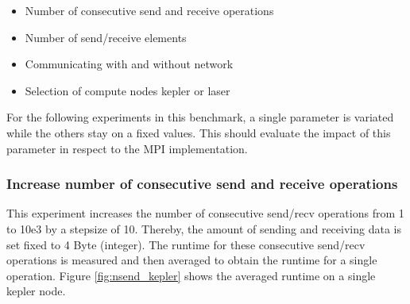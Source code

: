 \begin{itemize}
  \item Number of consecutive send and receive operations
  \item Number of send/receive elements
  \item Communicating with and without network
  \item Selection of compute nodes kepler or laser
\end{itemize}

For the following experiments in this benchmark, a single parameter is
variated while the others stay on a fixed values. This should evaluate
the impact of this parameter in respect to the MPI implementation.

\subsubsection*{Increase number of consecutive send and receive operations}
This experiment increases the number of consecutive send/recv
operations from 1 to 10e3 by a stepsize of 10. Thereby, the amount of
sending and receiving data is set fixed to 4 Byte (integer).  The
runtime for these consecutive send/recv operations is measured and
then averaged to obtain the runtime for a single operation.
Figure \ref{fig:nsend_kepler} shows the averaged runtime on a single
kepler node.



